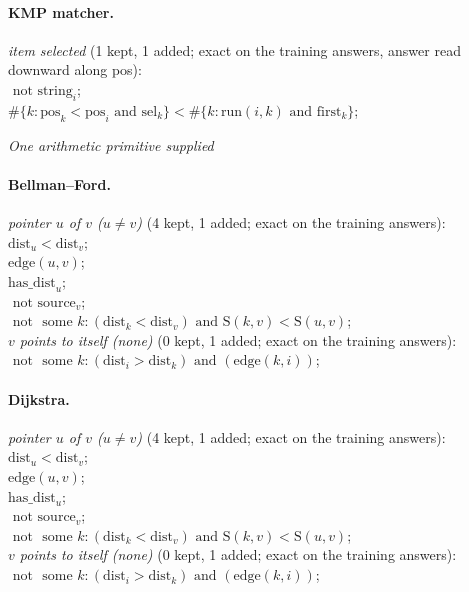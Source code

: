 \documentclass[10pt]{article}
\begin{document}
{\paragraph{KMP matcher.}
\emph{item selected} (1 kept, 1 added; exact on the training answers, answer read downward along pos):\\
\quad $\text{ not } \mathrm{string}_{i}$;\\
\quad $\#\{k: \mathrm{pos}_{k} < \mathrm{pos}_{i} \text{ and } \mathrm{sel}_{k}\} < \#\{k: \mathrm{run}(i, k) \text{ and } \mathrm{first}_{k}\}$;

\medskip\noindent\textit{One arithmetic primitive supplied}\par
\paragraph{Bellman--Ford.}
\emph{pointer $u$ of $v$ ($u \neq v$)} (4 kept, 1 added; exact on the training answers):\\
\quad $\mathrm{dist}_{u} < \mathrm{dist}_{v}$;\\
\quad $\mathrm{edge}(u, v)$;\\
\quad $\mathrm{has\_dist}_{u}$;\\
\quad $\text{ not } \mathrm{source}_{v}$;\\
\quad $\text{ not } \text{ some } k: (\mathrm{dist}_{k} < \mathrm{dist}_{v}) \text{ and } \mathrm{S}(k, v) < \mathrm{S}(u, v)$;\\
\emph{$v$ points to itself (none)} (0 kept, 1 added; exact on the training answers):\\
\quad $\text{ not } \text{ some } k: (\mathrm{dist}_{i} > \mathrm{dist}_{k}) \text{ and } (\mathrm{edge}(k, i))$;

\paragraph{Dijkstra.}
\emph{pointer $u$ of $v$ ($u \neq v$)} (4 kept, 1 added; exact on the training answers):\\
\quad $\mathrm{dist}_{u} < \mathrm{dist}_{v}$;\\
\quad $\mathrm{edge}(u, v)$;\\
\quad $\mathrm{has\_dist}_{u}$;\\
\quad $\text{ not } \mathrm{source}_{v}$;\\
\quad $\text{ not } \text{ some } k: (\mathrm{dist}_{k} < \mathrm{dist}_{v}) \text{ and } \mathrm{S}(k, v) < \mathrm{S}(u, v)$;\\
\emph{$v$ points to itself (none)} (0 kept, 1 added; exact on the training answers):\\
\quad $\text{ not } \text{ some } k: (\mathrm{dist}_{i} > \mathrm{dist}_{k}) \text{ and } (\mathrm{edge}(k, i))$;

}
\end{document}
